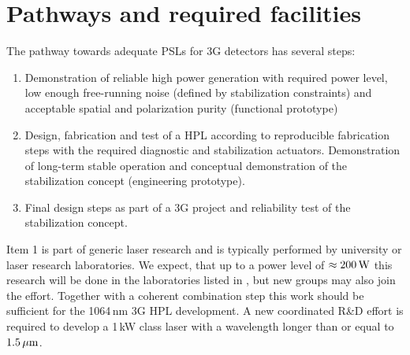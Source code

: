 %


\section{Pathways and required facilities} \label{sec:pathway}
The pathway towards adequate PSLs for 3G detectors has several steps:
\begin{enumerate}
	\item Demonstration of reliable high power generation with required power level, low enough free-running noise (defined by stabilization constraints) and acceptable spatial and polarization purity (functional prototype)
	\item Design, fabrication and test of a HPL according to reproducible fabrication steps with the required diagnostic and stabilization actuators. Demonstration of long-term stable operation and conceptual demonstration of the stabilization concept (engineering prototype).
	\item Final design steps as part of a 3G project and reliability test of the stabilization concept.
\end{enumerate}

\noindent Item 1 is part of generic laser research and is typically performed by university or laser research laboratories. We expect, that up to a power level of $ \approx 200 \, {\rm W} $ this research will be done in the laboratories listed in \cite{LightSource_RD_table}, but new groups may also join the effort. Together with a coherent combination step this work should be sufficient for the 1064\,nm 3G HPL development.
A new coordinated R\&D effort is required to develop a 1\,kW class laser with a wavelength longer than or equal to $ 1.5\, {\rm \mu m}$.

